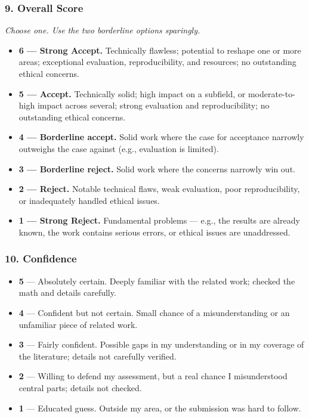 \subsubsection*{9. Overall Score}
{\itshape Choose one. Use the two borderline options sparingly.}

\begin{itemize}
  \item[{$[\;\;\;]$}] \textbf{6 --- Strong Accept.} Technically flawless; potential
  to reshape one or more areas; exceptional evaluation, reproducibility, and
  resources; no outstanding ethical concerns.
  \item[{$[\;\;\;]$}] \textbf{5 --- Accept.} Technically solid; high impact on a
  subfield, or moderate-to-high impact across several; strong evaluation and
  reproducibility; no outstanding ethical concerns.
  \item[{$[\;\;\;]$}] \textbf{4 --- Borderline accept.} Solid work where the case
  for acceptance narrowly outweighs the case against (e.g., evaluation is
  limited).
  \item[{$[\;\;\;]$}] \textbf{3 --- Borderline reject.} Solid work where the
  concerns narrowly win out.
  \item[{$[\;\;\;]$}] \textbf{2 --- Reject.} Notable technical flaws, weak
  evaluation, poor reproducibility, or inadequately handled ethical issues.
  \item[{$[\times]$}] \textbf{1 --- Strong Reject.} Fundamental problems ---
  e.g., the results are already known, the work contains serious errors, or
  ethical issues are unaddressed.
\end{itemize}

\subsubsection*{10. Confidence}

\begin{itemize}
  \item[{$[\times]$}] \textbf{5} --- Absolutely certain. Deeply familiar with
  the related work; checked the math and details carefully.
  \item[{$[\;\;\;]$}] \textbf{4} --- Confident but not certain. Small chance of a
  misunderstanding or an unfamiliar piece of related work.
  \item[{$[\;\;\;]$}] \textbf{3} --- Fairly confident. Possible gaps in my
  understanding or in my coverage of the literature; details not carefully
  verified.
  \item[{$[\;\;\;]$}] \textbf{2} --- Willing to defend my assessment, but a real
  chance I misunderstood central parts; details not checked.
  \item[{$[\;\;\;]$}] \textbf{1} --- Educated guess. Outside my area, or the
  submission was hard to follow.
\end{itemize}


